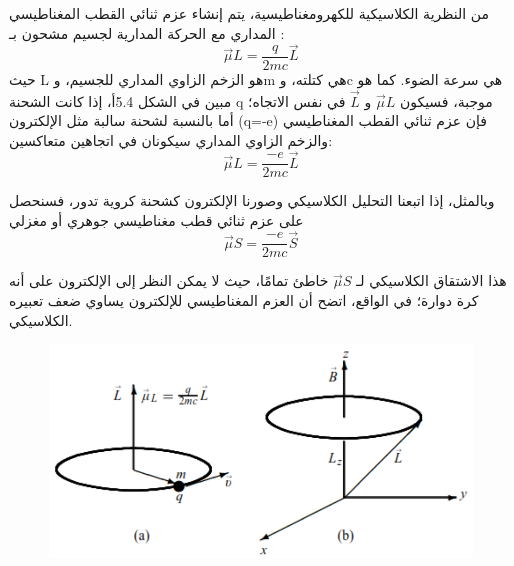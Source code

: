      من النظرية الكلاسيكية للكهرومغناطيسية، يتم إنشاء عزم ثنائي القطب المغناطيسي المداري مع الحركة المدارية لجسيم مشحون بـ :
\begin{equation}
\vec{\mu}L=\frac{q}{2mc}\vec{L}
\end{equation}
حيث L هو الزخم الزاوي المداري للجسيم، وm هي كتلته، وc هي سرعة الضوء. كما هو مبين في الشكل 5.4أ، إذا كانت الشحنة q موجبة، فسيكون $\vec{\mu}L$ و $\vec{L}$ في نفس الاتجاه؛ أما بالنسبة لشحنة سالبة مثل الإلكترون (q=-e) فإن عزم ثنائي القطب المغناطيسي والزخم الزاوي المداري سيكونان في اتجاهين متعاكسين:
\begin{equation}
	\vec{\mu}L=\frac{-e}{2mc}\vec{L}
\end{equation}

 وبالمثل، إذا اتبعنا التحليل الكلاسيكي وصورنا الإلكترون كشحنة كروية تدور، فسنحصل على عزم ثنائي قطب مغناطيسي جوهري أو مغزلي
 \begin{equation*}
 	\vec{\mu}S=\frac{-e}{2mc}\vec{S}
   \end{equation*}
   
   هذا الاشتقاق الكلاسيكي لـ $	\vec{\mu}S$ خاطئ تمامًا، حيث لا يمكن النظر إلى الإلكترون على أنه كرة دوارة؛ في الواقع، اتضح أن العزم المغناطيسي للإلكترون يساوي ضعف تعبيره الكلاسيكي.
 \begin{figure}[h]
 	\centering
 	\includegraphics[width=0.7\linewidth]{"Fig/Fig_III/العزم المغناطيسي"}
 	\caption{}
 	\label{fig:-}
 \end{figure}
 



